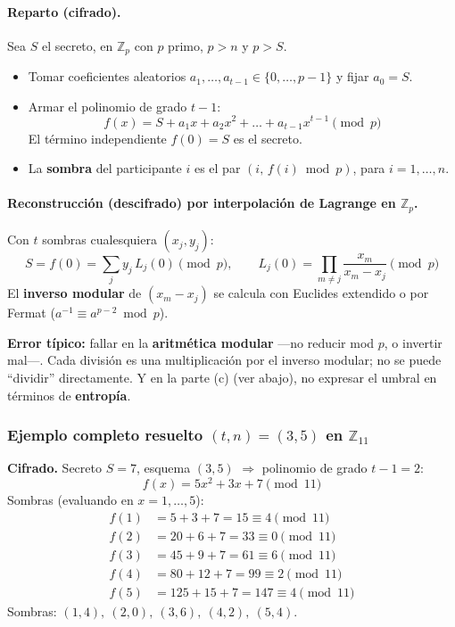 \documentclass[../main.tex]{subfiles}
\begin{document}
\paragraph{Reparto (cifrado).} Sea $S$ el secreto, en $\mathbb{Z}_p$ con $p$ primo,
$p > n$ y $p > S$.
\begin{itemize}[leftmargin=1.4em]
  \item Tomar coeficientes aleatorios $a_1, \dots, a_{t-1} \in \{0,\dots,p-1\}$ y fijar
  $a_0 = S$.
  \item Armar el polinomio de grado $t-1$:
  \[
  f(x) = S + a_1 x + a_2 x^2 + \dots + a_{t-1} x^{t-1} \pmod{p}
  \]
  El término independiente $f(0) = S$ es el secreto.
  \item La \textbf{sombra} del participante $i$ es el par $(i,\, f(i) \bmod p)$, para
  $i = 1, \dots, n$.
\end{itemize}

\paragraph{Reconstrucción (descifrado) por interpolación de Lagrange en
$\mathbb{Z}_p$.} Con $t$ sombras cualesquiera $(x_j, y_j)$:
\[
S = f(0) = \sum_{j} y_j \, L_j(0) \pmod p,
\qquad
L_j(0) = \prod_{m \neq j} \frac{x_m}{x_m - x_j} \pmod p
\]
El \textbf{inverso modular} de $(x_m - x_j)$ se calcula con Euclides extendido o por
Fermat ($a^{-1} \equiv a^{p-2} \bmod p$).

\begin{ojo}
\textbf{Error típico:} fallar en la \textbf{aritmética modular} —no reducir mod $p$,
o invertir mal—. Cada división es una multiplicación por el inverso modular; no se
puede ``dividir'' directamente. Y en la parte (c) (ver abajo), no expresar el umbral
en términos de \textbf{entropía}.
\end{ojo}

\subsubsection{Ejemplo completo resuelto $(t,n)=(3,5)$ en $\mathbb{Z}_{11}$}

\textbf{Cifrado.} Secreto $S = 7$, esquema $(3,5)$ $\Rightarrow$ polinomio de grado
$t-1 = 2$:
\[
f(x) = 5x^2 + 3x + 7 \pmod{11}
\]
Sombras (evaluando en $x = 1,\dots,5$):
\begin{align*}
f(1) &= 5 + 3 + 7 = 15 \equiv 4 \pmod{11}\\
f(2) &= 20 + 6 + 7 = 33 \equiv 0 \pmod{11}\\
f(3) &= 45 + 9 + 7 = 61 \equiv 6 \pmod{11}\\
f(4) &= 80 + 12 + 7 = 99 \equiv 2 \pmod{11}\\
f(5) &= 125 + 15 + 7 = 147 \equiv 4 \pmod{11}
\end{align*}
Sombras: $(1,4),\ (2,0),\ (3,6),\ (4,2),\ (5,4)$.
\end{document}

